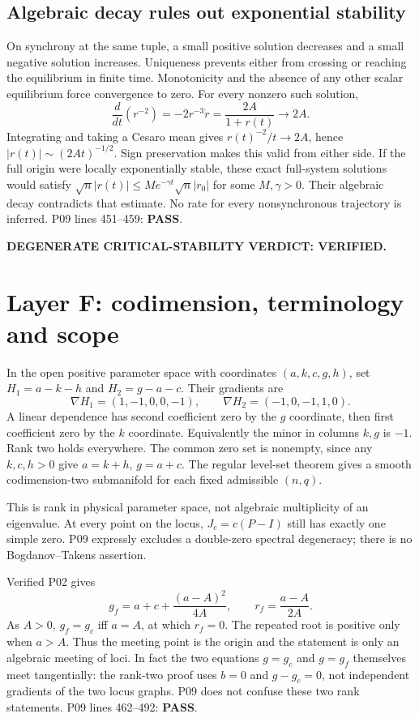 \documentclass[11pt]{article}
\newcommand{\lin}[1]{P09 lines #1}
\newcommand{\pass}{\textbf{PASS}}
\begin{document}
\subsection{Algebraic decay rules out exponential stability}
On synchrony at the same tuple, a small positive solution decreases and
a small negative solution increases. Uniqueness prevents either from
crossing or reaching the equilibrium in finite time. Monotonicity and
the absence of any other scalar equilibrium force convergence to zero.
For every nonzero such solution,
\[
 \frac{d}{dt}(r^{-2})=-2r^{-3}\dot r=\frac{2A}{1+r(t)}\longrightarrow2A.
\]
Integrating and taking a Cesaro mean gives
$r(t)^{-2}/t\to2A$, hence $|r(t)|\sim(2At)^{-1/2}$. Sign preservation
makes this valid from either side. If the full origin were locally
exponentially stable, these exact full-system solutions would satisfy
$\sqrt n|r(t)|\le M e^{-\gamma t}\sqrt n|r_0|$ for some
$M,\gamma>0$. Their algebraic decay contradicts that estimate.
No rate for every nonsynchronous trajectory is inferred.
\lin{451--459}: \pass.

\textbf{DEGENERATE CRITICAL-STABILITY VERDICT: VERIFIED.}

\section{Layer F: codimension, terminology and scope}
\label{sec:scope}
In the open positive parameter space with coordinates $(a,k,c,g,h)$,
set $H_1=a-k-h$ and $H_2=g-a-c$. Their gradients are
\[
 \nabla H_1=(1,-1,0,0,-1),\qquad
 \nabla H_2=(-1,0,-1,1,0).
\]
A linear dependence has second coefficient zero by the $g$ coordinate,
then first coefficient zero by the $k$ coordinate. Equivalently the
minor in columns $k,g$ is $-1$. Rank two holds everywhere. The common
zero set is nonempty, since any $k,c,h>0$ give $a=k+h$, $g=a+c$.
The regular level-set theorem gives a smooth codimension-two
submanifold for each fixed admissible $(n,q)$.

This is rank in physical parameter space, not algebraic multiplicity of
an eigenvalue. At every point on the locus, $J_c=c(P-I)$ still has exactly
one simple zero. P09 expressly excludes a double-zero spectral degeneracy;
there is no Bogdanov--Takens assertion.

Verified P02 gives
\[
 g_f=a+c+\frac{(a-A)^2}{4A},\qquad r_f=\frac{a-A}{2A}.
\]
As $A>0$, $g_f=g_c$ iff $a=A$, at which $r_f=0$. The repeated root is
positive only when $a>A$. Thus the meeting point is the origin and the
statement is only an algebraic meeting of loci. In fact the two equations
$g=g_c$ and $g=g_f$ themselves meet tangentially: the rank-two proof uses
$b=0$ and $g-g_c=0$, not independent gradients of the two locus graphs.
P09 does not confuse these two rank statements. \lin{462--492}: \pass.
\end{document}
